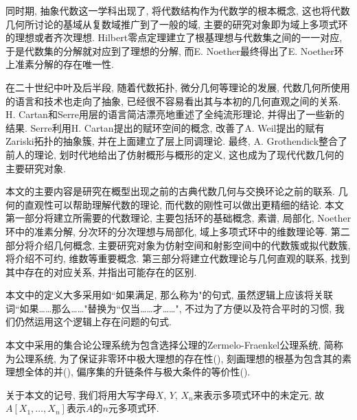 同时期, 抽象代数这一学科出现了, 将代数结构作为代数学的根本概念, 这也将代数几何所讨论的基域从复数域推广到了一般的域, 主要的研究对象即为域上多项式环的理想或者齐次理想. Hilbert零点定理建立了根基理想与代数集之间的一一对应, 于是代数集的分解就对应到了理想的分解, 而E. Noether最终得出了E. Noether环上准素分解的存在唯一性.

在二十世纪中叶及后半段, 随着代数拓扑, 微分几何等理论的发展, 代数几何所使用的语言和技术也走向了抽象, 已经很不容易看出其与本初的几何直观之间的关系. H. Cartan和Serre用层的语言简洁漂亮地重述了全纯流形理论, 并得出了一些新的结果. Serre利用H. Cartan提出的赋环空间的概念, 改善了A. Weil提出的赋有Zariski拓扑的抽象簇, 并在上面建立了层上同调理论. 最终, A. Grothendick整合了前人的理论, 划时代地给出了仿射概形与概形的定义, 这也成为了现代代数几何的主要研究对象.

本文的主要内容是研究在概型出现之前的古典代数几何与交换环论之前的联系. 几何的直观性可以帮助理解代数的理论, 而代数的刚性可以做出更精细的结论. 本文第一部分将建立所需要的代数理论, 主要包括环的基础概念, 素谱, 局部化, Noether环中的准素分解, 分次环的分次理想与局部化, 域上多项式环中的维数理论等. 第二部分将介绍几何概念, 主要研究对象为仿射空间和射影空间中的代数簇或拟代数簇, 将介绍不可约, 维数等重要概念. 第三部分将建立代数理论与几何直观的联系, 找到其中存在的对应关系, 并指出可能存在的区别.

本文中的定义大多采用如``如果满足, 那么称为"的句式, 虽然逻辑上应该将关联词``如果\dots\dots 那么\dots\dots"替换为``仅当\dots\dots 才\dots\dots ", 不过为了方便以及符合平时的习惯, 我们仍然运用这个逻辑上存在问题的句式.

本文中采用的集合论公理系统为包含选择公理的Zermelo-Fraenkel公理系统, 简称为公理系统, 为了保证非零环中极大理想的存在性(), 刻画理想的根基为包含其的素理想全体的并(), 偏序集的升链条件与极大条件的等价性().

关于本文的记号, 我们将用大写字母$X$, $Y$, $X_n$来表示多项式环中的未定元, 故$A[X_1, \dotsc, X_n]$表示$A$的$n$元多项式环.%
